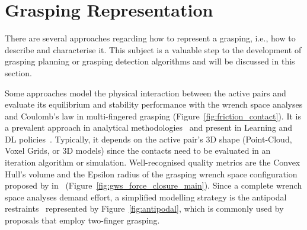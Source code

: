 





\section{Grasping Representation}
\label{cap2:related_work:sec:grasping_representation}


There are several approaches regarding how to represent a grasping, i.e., how to describe and characterise it. This subject is a valuable step to the development of grasping planning or grasping detection algorithms and will be discussed in this section.  


Some approaches model the physical interaction between the active pairs and evaluate its equilibrium and stability performance with the wrench space analyses and Coulomb's law in multi-fingered grasping (Figure~\ref{fig:friction_contact}). It is a prevalent approach in analytical methodologies~\cite{liu2004complete,el2009computing, miller2004graspit, AndrewT2004} and present in Learning and \ac{DL} policies~\cite{Mahler2016, Mahler2017b, Mahler2017d, Mahler2017, Mahler2019}. Typically, it depends on the active pair's 3D shape (Point-Cloud, Voxel Grids, or 3D models) since the contacts need to be evaluated in an iteration algorithm or simulation. Well-recognised quality metrics are the Convex Hull's volume and the Epsilon radius of the grasping wrench space configuration proposed by \citeauthor{Ferrari} in~\cite{Ferrari} (Figure~\ref{fig:gws_force_closure_main}). Since a complete wrench space analyses  demand effort, a simplified modelling strategy is the antipodal restraints~\cite{Nguyen1987_1} represented by Figure~\ref{fig:antipodal}, which is commonly used by proposals that employ two-finger grasping. 

